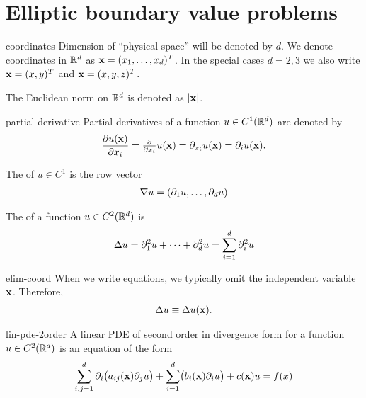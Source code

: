 \section{Elliptic boundary value problems}

\begin{Notation}{coordinates}
  Dimension of ``physical space'' will be denoted by $d$.  We denote
  coordinates in $\mathbb R^d$ as $\mathbf x = (x_1,\dots,x_d)^T$. In the special
  cases $d=2,3$ we also write $\mathbf x = (x,y)^T$ and $\mathbf x = (x,y,z)^T$.

  The Euclidean norm on $\mathbb R^d$ is denoted as $\lvert\mathbf x\rvert$.
\end{Notation}

\begin{Notation}{partial-derivative}
  Partial derivatives of a function $u\in C^1(\mathbb R^d)$ are denoted by
  \begin{gather*}
    \frac{\partial u(\mathbf x)}{\partial x_i} = \tfrac{\partial}{\partial x_i} u(\mathbf x)
    = \partial_{x_i} u(\mathbf x) = \partial_i u(\mathbf x).
  \end{gather*}

  The  of $u \in C^1$ is the row vector
  \begin{gather*}
    \nabla u = (\partial_1u,\dots,\partial_du)
  \end{gather*}

  The  of a function $u\in C^2(\mathbb R^d)$ is
  \begin{gather*}
    \Delta u = \partial_1^2 u + \dots + \partial_d^2 u = \sum_{i=1}^d \partial_i^2 u
  \end{gather*}
\end{Notation}

\begin{Notation}{elim-coord}
  When we write equations, we typically omit the independent variable
  $\mathbf x$. Therefore,
  \begin{gather*}
    \Delta u \equiv \Delta u(\mathbf x).
  \end{gather*}
\end{Notation}

\begin{Definition}{lin-pde-2order}
  A linear PDE of second order in divergence form for a function
  $u\in C^2(\mathbb R^d)$ is an equation of the form
  \begin{gather}
    \sum_{i,j=1}^d \partial_i \bigl(a_{ij}(\mathbf x) \partial_j u\bigr)
    + \sum_{i=1}^d \bigl(b_i(\mathbf x) \partial_i u\bigr) + c(\mathbf x) u = f(x)
  \end{gather}
\end{Definition}

